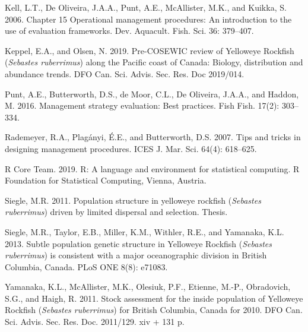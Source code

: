 \documentclass[11pt]{book}
\begin{document}
\leavevmode\hypertarget{ref-kell2006}{}%
Kell, L.T., De Oliveira, J.A.A., Punt, A.E., McAllister, M.K., and Kuikka, S. 2006. Chapter 15 Operational management procedures: An introduction to the use of evaluation frameworks. Dev. Aquacult. Fish. Sci. 36: 379--407.

\leavevmode\hypertarget{ref-keppel2019}{}%
Keppel, E.A., and Olsen, N. 2019. Pre-COSEWIC review of Yelloweye Rockfish (\emph{Sebastes ruberrimus}) along the Pacific coast of Canada: Biology, distribution and abundance trends. DFO Can. Sci. Advis. Sec. Res. Doc 2019/014.

\leavevmode\hypertarget{ref-punt2016}{}%
Punt, A.E., Butterworth, D.S., de Moor, C.L., De Oliveira, J.A.A., and Haddon, M. 2016. Management strategy evaluation: Best practices. Fish Fish. 17(2): 303--334.

\leavevmode\hypertarget{ref-rademeyer2007}{}%
Rademeyer, R.A., Plagányi, É.E., and Butterworth, D.S. 2007. Tips and tricks in designing management procedures. ICES J. Mar. Sci. 64(4): 618--625.

\leavevmode\hypertarget{ref-r2019}{}%
R Core Team. 2019. R: A language and environment for statistical computing. R Foundation for Statistical Computing, Vienna, Austria.

\leavevmode\hypertarget{ref-siegle2011}{}%
Siegle, M.R. 2011. Population structure in yelloweye rockfish (\emph{Sebastes ruberrimus}) driven by limited dispersal and selection. Thesis.

\leavevmode\hypertarget{ref-siegle2013}{}%
Siegle, M.R., Taylor, E.B., Miller, K.M., Withler, R.E., and Yamanaka, K.L. 2013. Subtle population genetic structure in Yelloweye Rockfish (\emph{Sebastes ruberrimus}) is consistent with a major oceanographic division in British Columbia, Canada. PLoS ONE 8(8): e71083.

\leavevmode\hypertarget{ref-yamanaka2011}{}%
Yamanaka, K.L., McAllister, M.K., Olesiuk, P.F., Etienne, M.-P., Obradovich, S.G., and Haigh, R. 2011. Stock assessment for the inside population of Yelloweye Rockfish (\emph{Sebastes ruberrimus}) for British Columbia, Canada for 2010. DFO Can. Sci. Advis. Sec. Res. Doc. 2011/129. xiv + 131 p.
\end{document}
